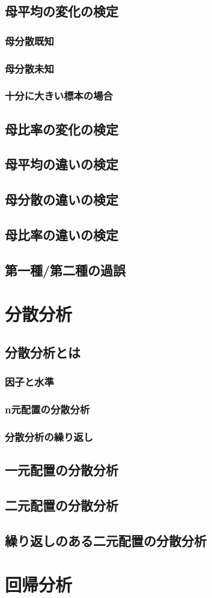 \documentclass[11pt,a4paper]{jreport}
\begin{document}
\subsection{母平均の変化の検定}
\subsubsection{母分散既知}
\subsubsection{母分散未知}
\subsubsection{十分に大きい標本の場合}
\subsection{母比率の変化の検定}
\subsection{母平均の違いの検定}
\subsection{母分散の違いの検定}
\subsection{母比率の違いの検定}
\subsection{第一種/第二種の過誤}

\section{分散分析}
\subsection{分散分析とは}
\subsubsection{因子と水準}
\subsubsection{n元配置の分散分析}
\subsubsection{分散分析の繰り返し}
\subsection{一元配置の分散分析}
\subsection{二元配置の分散分析}
\subsection{繰り返しのある二元配置の分散分析}
\section{回帰分析}
\end{document}
